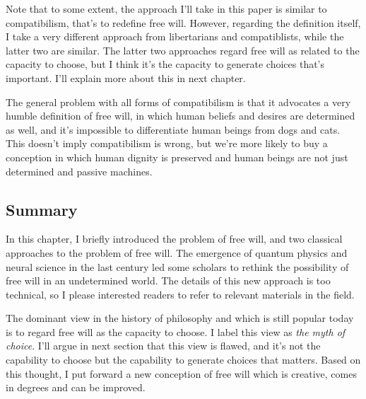 Note that to some extent, the approach I'll take in this paper is similar to compatibilism, that's to redefine free will. However, regarding the definition itself, I take a very different approach from libertarians and compatiblists, while the latter two are similar. The latter two approaches regard free will as related to the capacity to choose, but I think it's the capacity to generate choices that's important. I'll explain more about this in next chapter.

The general problem with all forms of compatibilism is that it advocates a very humble definition of free will, in which human beliefs and desires are determined as well, and it's impossible to differentiate human beings from dogs and cats. This doesn't imply compatibilism is wrong, but we're more likely to buy a conception in which human dignity is preserved and human beings are not just determined and passive machines.

\subsection{Summary}

In this chapter, I briefly introduced the problem of free will, and two classical approaches to the problem of free will. The emergence of quantum physics and neural science in the last century led some scholars to rethink the possibility of free will in an undetermined world. The details of this new approach is too technical, so I please interested readers to refer to relevant materials in the field.

The dominant view in the history of philosophy and which is still popular today is to regard free will as the capacity to choose. I label this view as \emph{the myth of choice}. I'll argue in next section that this view is flawed, and it's not the capability to choose but the capability to generate choices that matters. Based on this thought, I put forward a new conception of free will which is creative, comes in degrees and can be improved.
